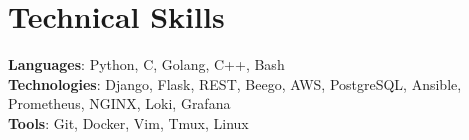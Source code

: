 \documentclass[letterpaper,11pt]{article}
\begin{document}
%
\section{Technical Skills}
 \begin{itemize}[leftmargin=0.15in, label={}]
    \small{\item{
     \textbf{Languages}{: Python, C, Golang, C++, Bash} \\
     \textbf{Technologies}{: Django, Flask, REST, Beego, AWS, PostgreSQL, Ansible, Prometheus, NGINX, Loki, Grafana} \\
     \textbf{Tools}{: Git, Docker, Vim, Tmux, Linux} \\
    }}
 \end{itemize}


\end{document}
